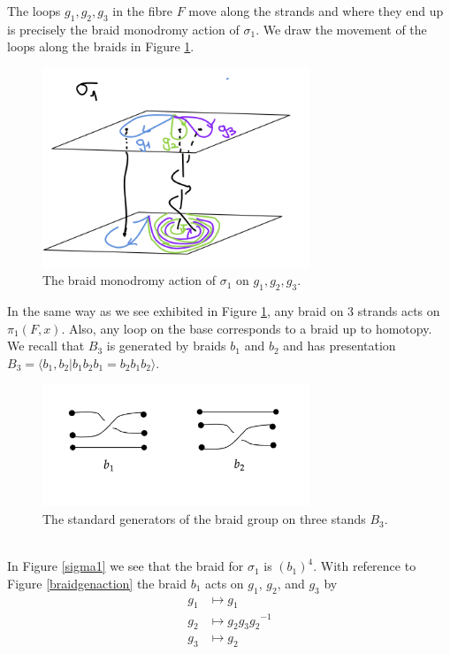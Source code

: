 \documentclass[oneside,reqno]{amsart}
\theoremstyle{definition}
\theoremstyle{definition}
\theoremstyle{definition}
\theoremstyle{definition}
\begin{document}
The loops $g_1,g_2,g_3$ in the fibre $F$ move along the strands and where they end up is precisely the braid monodromy action of $\sigma_1$. We draw the movement of the loops along the braids in Figure \ref{braidaction1}.
\begin{figure}[!h]
    \centering
    \includegraphics[width=8cm]{rank2exmp/braidaction1.png}
    \caption{The braid monodromy action of $\sigma_1$ on $g_1,g_2,g_3$.}
    \label{braidaction1}
\end{figure}
In the same way as we see exhibited in Figure \ref{braidaction1}, any braid on 3 strands acts on $\pi_1(F,x)$. Also, any loop on the base corresponds to a braid up to homotopy. We recall that $B_3$ is generated by braids $b_1$ and $b_2$ and has presentation $B_3 = \langle b_1,b_2 | b_1 b_2 b_1 = b_2 b_1 b_2\rangle$.
\begin{figure}[!h]
    \centering
    \includegraphics[width=8cm]{rank2exmp/B3.png}
    \caption{The standard generators of the braid group on three stands $B_3$.}
    \label{braidgenerators}
\end{figure}\\
\newline
In Figure \ref{sigma1} we see that the braid for $\sigma_1$ is $(b_1)^4$. With reference to Figure \ref{braidgenaction} the braid $b_1$ acts on $g_1$, $g_2$, and $g_3$ by
\begin{align*}
    g_1 &\mapsto g_1 \\
    g_2 &\mapsto g_2 g_3 {g_2}^{-1} \\
    g_3 &\mapsto g_2 
\end{align*}
\end{document}
